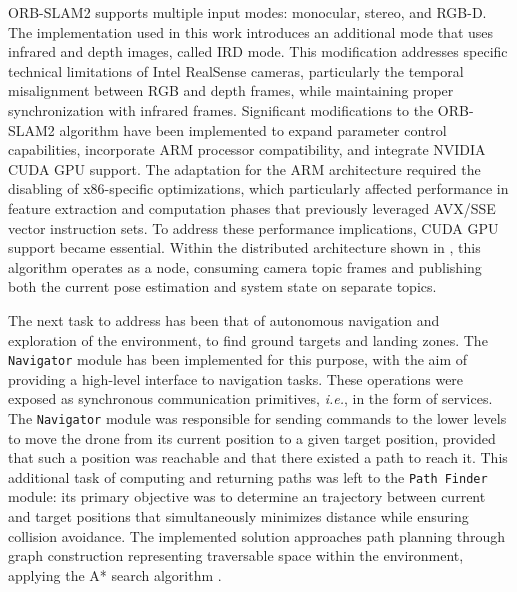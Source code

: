 ORB-SLAM2 supports multiple input modes: monocular, stereo, and RGB-D. The implementation used in this work introduces an additional mode that uses infrared and depth images, called IRD mode. This modification addresses specific technical limitations of Intel RealSense cameras, particularly the temporal misalignment between RGB and depth frames, while maintaining proper synchronization with infrared frames. Significant modifications to the ORB-SLAM2 algorithm have been implemented to expand parameter control capabilities, incorporate ARM processor compatibility, and integrate NVIDIA CUDA GPU support. The adaptation for the ARM architecture required the disabling of x86-specific optimizations, which particularly affected performance in feature extraction and computation phases that previously leveraged AVX/SSE vector instruction sets. To address these performance implications, CUDA GPU support became essential. Within the distributed architecture shown in , this algorithm operates as a \ROS node, consuming camera topic frames and publishing both the current pose estimation and system state on separate topics.

The next task to address has been that of autonomous navigation and exploration of the environment, to find ground targets and landing zones. The \texttt{Navigator} module has been implemented for this purpose, with the aim of providing a high-level interface to navigation tasks. These operations were exposed as \ROS synchronous communication primitives, \emph{i.e.}, in the form of services. The \texttt{Navigator} module was responsible for sending commands to the lower levels to move the drone from its current position to a given target position, provided that such a position was reachable and that there existed a path to reach it. This additional task of computing and returning paths was left to the \texttt{Path Finder} module: its primary objective was to determine an trajectory between current and target positions that simultaneously minimizes distance while ensuring collision avoidance. The implemented solution approaches path planning through graph construction representing traversable space within the environment, applying the A* search algorithm \cite{guruji_time-efficient_2016}.

